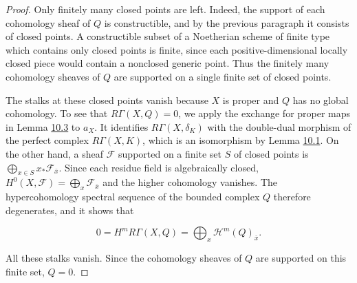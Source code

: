 \documentclass[11pt]{article}
\begin{document}
\begin{proof}[{Proof}]
Only finitely many closed points are left. Indeed, the support of each cohomology sheaf of \(Q\) is constructible, and by the previous paragraph it consists of closed points. A constructible subset of a Noetherian scheme of finite type which contains only closed points is finite, since each positive-dimensional locally closed piece would contain a nonclosed generic point. Thus the finitely many cohomology sheaves of \(Q\) are supported on a single finite set of closed points.

The stalks at these closed points vanish because \(X\) is proper and \(Q\) has no global cohomology. To see that \(R\Gamma(X,Q)=0\), we apply the exchange for proper maps in Lemma \hyperref[bp110]{10.3} to \(a_X\). It identifies \(R\Gamma(X,\delta_K)\) with the double-dual morphism of the perfect complex \(R\Gamma(X,K)\), which is an isomorphism by Lemma \hyperref[bp105]{10.1}. On the other hand, a sheaf \(\mathcal F\) supported on a finite set \(S\) of closed points is \(\bigoplus_{x\in S}x_*\mathcal F_{\bar x}\). Since each residue field is algebraically closed, \(H^0(X,\mathcal F)=\bigoplus_x
\mathcal F_{\bar x}\) and the higher cohomology vanishes. The hypercohomology spectral sequence of the bounded complex \(Q\) therefore degenerates, and it shows that

\[
0=H^mR\Gamma(X,Q)
=\bigoplus_x\mathcal H^m(Q)_{\bar x}.
\]

All these stalks vanish. Since the cohomology sheaves of \(Q\) are supported on this finite set, \(Q=0\).


\end{proof}
\end{document}
